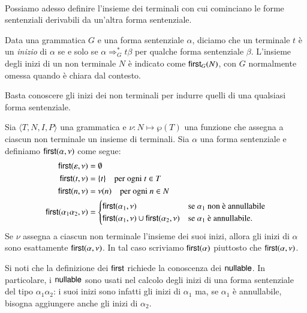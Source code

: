 \mbox{}\\

Possiamo adesso definire l'insieme dei terminali con cui cominciano
le forme sentenziali derivabili da un'altra forma sentenziale.
%
\begin{definition}\label{def:first}
Data una grammatica $G$ e una forma sentenziale $\alpha$, diciamo che un
terminale $t$ \`e un \emph{inizio} di $\alpha$ se e solo se
$\alpha\Rightarrow^*_Gt\beta$ per qualche forma sentenziale $\beta$.
L'insieme degli inizi di un non terminale
$N$ \`e indicato come $\mathsf{first}_G(N)$, con $G$
normalmente omessa quando \`e chiara dal contesto.
\end{definition}
%
\noindent
Basta conoscere gli inizi dei non terminali
per indurre quelli di una qualsiasi forma sentenziale.
%
\begin{proposition}\label{prop:extend_first}
Sia $\langle T,N,I,P\rangle$ una grammatica e
$\nu:N\mapsto\wp(T)$ una funzione che assegna a ciascun non terminale
un insieme di terminali.
Sia $\alpha$ una forma sentenziale e definiamo $\mathsf{first}(\alpha,\nu)$ come
segue:
\begin{equation}\label{eq:first}
\begin{split}
  \mathsf{first}(\varepsilon,\nu)&=\emptyset\\
  \mathsf{first}(t,\nu)&=\{t\}\quad\text{per ogni $t\in T$}\\
  \mathsf{first}(n,\nu)&=\nu(n)\quad\text{per ogni $n\in N$}\\
  \mathsf{first}(\alpha_1\alpha_2,\nu)&=\begin{cases}
    \mathsf{first}(\alpha_1,\nu) & \text{se $\alpha_1$ non \`e annullabile}\\
    \mathsf{first}(\alpha_1,\nu)\cup\mathsf{first}(\alpha_2,\nu) &
      \text{se $\alpha_1$ \`e annullabile.}
  \end{cases}
\end{split}
\end{equation}
Se $\nu$ assegna a ciascun non terminale l'insieme dei suoi inizi,
allora gli inizi di $\alpha$ sono esattamente $\mathsf{first}(\alpha,\nu)$.
In tal caso scriviamo $\mathsf{first}(\alpha)$ piuttosto che $\mathsf{first}(\alpha,\nu)$.
\end{proposition}
%
\noindent
Si noti che la definizione dei $\mathsf{first}$ richiede la conoscenza dei $\mathsf{nullable}$.
In particolare, i $\mathsf{nullable}$ sono usati nel calcolo degli inizi di una
forma sentenziale del tipo $\alpha_1\alpha_2$: i suoi inizi sono infatti
gli inizi di $\alpha_1$ ma, se $\alpha_1$ \`e annullabile, bisogna aggiungere
anche gli inizi di $\alpha_2$.

